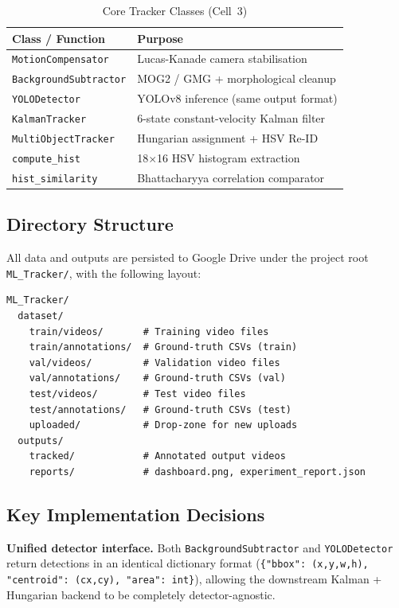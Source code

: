 \documentclass[10pt, conference, compsocconf]{IEEEtran}
\begin{document}
\begin{table}[!t]
\caption{Core Tracker Classes (Cell~3)}
\label{tab:classes}
\centering
\footnotesize
\setlength{\tabcolsep}{3pt}
\begin{tabular}{ll}
\toprule
\textbf{Class / Function} & \textbf{Purpose} \\
\midrule
\texttt{MotionCompensator}    & Lucas-Kanade camera stabilisation \\
\texttt{BackgroundSubtractor} & MOG2 / GMG + morphological cleanup \\
\texttt{YOLODetector}         & YOLOv8 inference (same output format) \\
\texttt{KalmanTracker}        & 6-state constant-velocity Kalman filter \\
\texttt{MultiObjectTracker}   & Hungarian assignment + HSV Re-ID \\
\texttt{compute\_hist}        & 18$\times$16 HSV histogram extraction \\
\texttt{hist\_similarity}     & Bhattacharyya correlation comparator \\
\bottomrule
\end{tabular}
\end{table}

\subsection{Directory Structure}
All data and outputs are persisted to Google Drive under the project
root \texttt{ML\_Tracker/}, with the following layout:

\begin{lstlisting}[caption={Google Drive directory structure.}, label={lst:dirs}]
ML_Tracker/
  dataset/
    train/videos/       # Training video files
    train/annotations/  # Ground-truth CSVs (train)
    val/videos/         # Validation video files
    val/annotations/    # Ground-truth CSVs (val)
    test/videos/        # Test video files
    test/annotations/   # Ground-truth CSVs (test)
    uploaded/           # Drop-zone for new uploads
  outputs/
    tracked/            # Annotated output videos
    reports/            # dashboard.png, experiment_report.json
\end{lstlisting}

\subsection{Key Implementation Decisions}

\textbf{Unified detector interface.} Both \texttt{BackgroundSubtractor}
and \texttt{YOLODetector} return detections in an identical dictionary
format (\texttt{\{"bbox": (x,y,w,h), "centroid": (cx,cy), "area": int\}}),
allowing the downstream Kalman + Hungarian backend to be completely
detector-agnostic.
\end{document}
